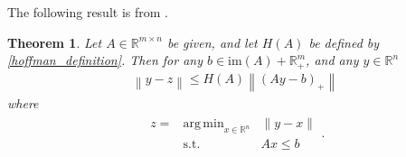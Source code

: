 \documentclass{article}
\newtheorem{theorem}{Theorem}[section]
\theoremstyle{case}
\numberwithin{theorem}{subsection}
\DeclareMathOperator*{\argmin}{arg\,min}
\newcommand{\reals}{\mathbb R}
\newcommand{\Rn}{\mathbb R^n}
\newcommand{\image}{{\textrm{im}}}
\begin{document}
The following result is from \cite{pena2020new}.
\begin{theorem}
\label{hoffmans_theorem}
Let $A \in \mathbb R^{m \times n}$ be given, and let $H(A)$ be defined by \cref{hoffman_definition}.
Then for any
$b \in \image(A) + \reals^m_+$, and any $y \in \Rn$
\begin{align*}
\left\|y - z\right\| \le H(A) \left\|\left(Ay - b\right)_+\right\|
\end{align*}
where
\begin{align*}
\begin{array}{ccc}
z = & \argmin_{x \in \Rn} & \|y - x\| \\
      & \textrm{s.t.}    & Ax \le b
\end{array}.
\end{align*}
\end{theorem}
\end{document}
